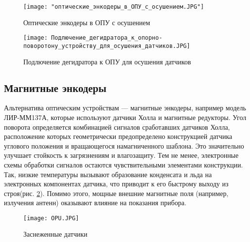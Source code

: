 \begin{figure}[htbp]
    \centering
    \begin{minipage}{0.48\linewidth}
       \texttt{[image: "оптические\_энкодеры\_в\_ОПУ\_с\_осушением.JPG"]} 
        \caption{Оптические энкодеры в ОПУ с осушением}
        \label{Degidrator1} 
    \end{minipage}\hfill
    \begin{minipage}{0.48\linewidth}
       \centering
        \texttt{[image: Подлючение\_дегидратора\_к\_опорно-поворотону\_устройству\_для\_осушения\_датчиков.JPG]} 
        \caption{Подлючение дегидратора к ОПУ для осушения датчиков}
      \label{Degidrator2}
    \end{minipage}
\end{figure}

\FloatBarrier
 \subsection{Магнитные энкодеры}
  
  Альтернатива оптическим устройствам — магнитные энкодеры, например модель ЛИР-ММ137А, 
  которые используют датчики Холла и магнитные редукторы. Угол поворота определяется комбинацией сигналов сработавших датчиков Холла, 
  расположение которых геометрически предопределено конструкцией датчика углового положения и вращающегося намагниченного шаблона.
  Это значительно улучшает стойкость к загрязнениям и влагозащиту. 
  Тем не менее, электронные схемы обработки сигналов остаются чувствительными элементами конструкции. 
  Так, низкие температуры вызывают образование конденсата и льда на электронных компонентах датчика, что приводит к его быстрому 
  выходу из строя(рис. \ref{OpuInSnow}). Помимо этого, мощные внешние магнитные поля (например, излучения антенн) оказывают влияние на показания прибора.
\FloatBarrier

   \begin{figure}[!ht]
    \centering
    \texttt{[image: OPU.JPG]}
    \caption{Заснеженные датчики}
    \label{OpuInSnow}
  \end{figure}

\FloatBarrier

